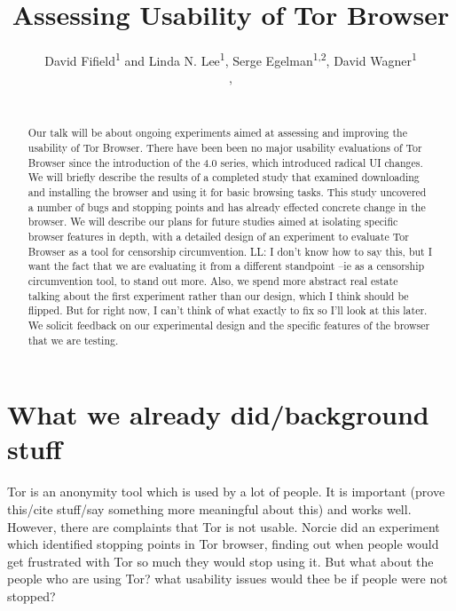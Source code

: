 \documentclass{sig-alternate-hotpets15}
\begin{document}
\title{Assessing Usability of Tor Browser}
\author{
 \alignauthor David Fifield\textsuperscript{1} and Linda N. Lee\textsuperscript{1}, Serge Egelman\textsuperscript{1,2}, David Wagner\textsuperscript{1}\\
   \vspace{0.5em}
   , \\
   \\
}

\maketitle

\begin{abstract}
Our talk will be about ongoing experiments aimed at
assessing and improving the usability of Tor Browser.
There have been been no major usability evaluations of
Tor Browser since the introduction of the 4.0 series,
which introduced radical UI changes.
We will briefly describe the results of a completed study
that examined downloading and installing the browser
and using it for basic browsing tasks.
This study uncovered a number of bugs and stopping points
and has already effected concrete change in the browser.
We will describe our plans for future studies aimed at
isolating specific browser features in depth,
with a detailed design of an experiment to evaluate
Tor Browser as a tool for censorship circumvention.
{\color {red}LL: I don't know how to say this, but I want the fact that we are evaluating it from a different standpoint --ie as a censorship circumvention tool, to stand out more. Also, we spend more abstract real estate talking about the first experiment rather than our design, which I think should be flipped. But for right now, I can't think of what exactly to fix so I'll look at this later.}
We solicit feedback on our experimental design
and the specific features of the browser that we are testing.
\end{abstract}


\section{What we already did/background stuff}
Tor is an anonymity tool which is used by a lot of people. It is important (prove this/cite stuff/say something more meaningful about this) and works well. However, there are complaints that Tor is not usable. Norcie did an experiment \cite{norcie2012eliminating} which identified stopping points in Tor browser, finding out when people would get frustrated with Tor so much they would stop using it. But what about the people who are using Tor? what usability issues would thee be if people were not stopped? 
\end{document}
